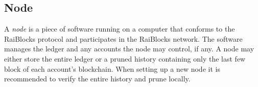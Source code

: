 \subsection{Node}
A \textit{node} is a piece of software running on a computer that conforms to the RaiBlocks protocol and participates in the RaiBlocks network. The software manages the ledger and any accounts the node may control, if any. A node may either store the entire ledger or a pruned history containing only the last few block of each account's blockchain. When setting up a new node it is recommended to verify the entire history and prune locally.